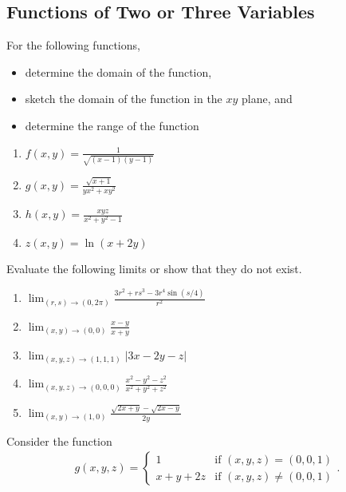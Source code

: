 \subsection{Functions of Two or Three Variables}

\BEN
\item 
For the following functions, 
\begin{itemize}
\item determine the domain of the function,
\item sketch the domain of the function in the $xy$ plane, and
\item determine the range of the function
\end{itemize}
\begin{enumerate}
  \item $f(x,y) = \frac{1}{\sqrt{(x-1)(y-1)}}$
  \item $g(x,y) = \frac{\sqrt{x+1}}{yx^2+xy^2}$
  \item $h(x,y) = \frac{xyz}{x^2+y^2-1}$
  \item $z(x,y) = \ln(x+2y)$
\end{enumerate}
\item 
Evaluate the following limits or show that they do not exist.  
\begin{enumerate}
\item $\displaystyle \lim_{(r,s)\rightarrow(0,2\pi) } \frac{3r^2+rs^3-3r^4\sin (s/4)}{r^2}$
\item $\displaystyle \lim_{(x,y)\rightarrow(0,0) } \frac{x-y}{x+y}$
\item $\displaystyle \lim_{(x,y,z)\rightarrow(1,1,1)} \big|3x - 2y - z \big|$
\item $\displaystyle \lim_{(x,y,z)\rightarrow(0,0,0) } \frac{x^2-y^2-z^2}{x^2+y^2+z^2}$
\item $\displaystyle \lim_{(x,y)\rightarrow(1,0) } \frac{\sqrt{2x+y}-\sqrt{2x-y}}{2y}$
\end{enumerate}
\item 
Consider the function
\begin{align*}
g(x,y,z) = \left\{
\begin{array}{rl}
1 & \text{if } (x,y,z) = (0,0,1) \\
x + y + 2z & \text{if } (x,y,z) \ne (0,0,1) 
\end{array} \right. .
\end{align*}
